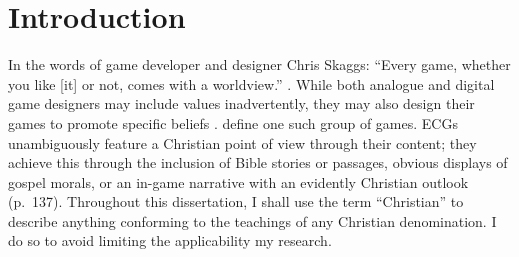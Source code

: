 \chapter{Introduction}



In the words of game developer and designer Chris Skaggs: ``Every game, whether you like [it] or not, comes with a worldview.'' \parencite[136]{schut_making_2013}. While both analogue and digital game designers may include values inadvertently, they may also design their games to promote specific beliefs \parencite{bogost_persuasive_2007, flanagan_values_2014}. \textcite{schut_making_2013} define one such group of games. \acp{ECG} unambiguously feature a Christian point of view through their content; they achieve this through the inclusion of Bible stories or passages, obvious displays of gospel morals, or an in-game narrative with an evidently Christian outlook (p.\ 137). Throughout this dissertation, I shall use the term ``Christian'' to describe anything conforming to the teachings of any Christian denomination. I do so to avoid limiting the applicability my research. %


